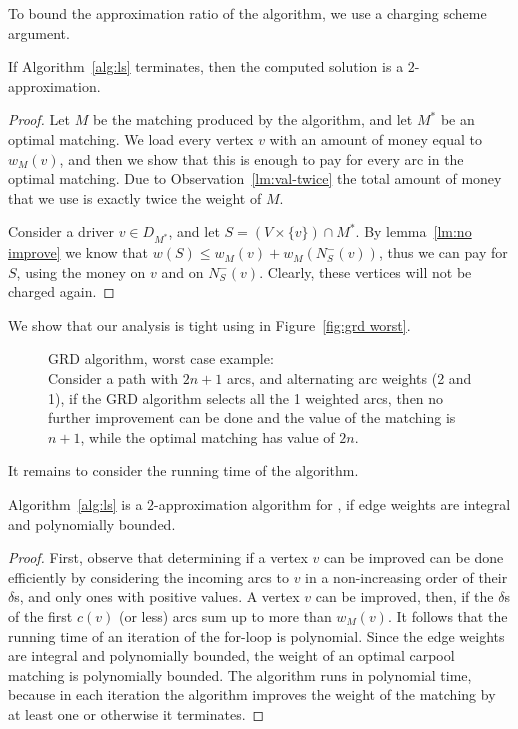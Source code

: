 To bound the approximation ratio of the algorithm, we use a charging
scheme argument.

\begin{lemma}
If Algorithm~\ref{alg:ls} terminates, then the computed solution is a
$2$-approximation.
\end{lemma}
\begin{proof}
Let $M$ be the matching produced by the algorithm, and let $M^*$ be an
optimal matching.  We load every vertex $v$ with an amount of money
equal to $w_M(v)$, and then we show that this is enough to pay for
every arc in the optimal matching.  Due to
Observation~\ref{lm:val-twice} the total amount of money that we use
is exactly twice the weight of $M$.

Consider a driver $v \in D_{M^*}$, and let $S = (V \times \{v\}) \cap
M^*$.  By lemma~\ref{lm:no improve} we know that $w(S) \leq w_M(v) +
w_M(N^-_S(v))$, thus we can pay for $S$, using the money on $v$ and on
$N^-_S(v)$.  Clearly, these vertices will not be charged again.
\end{proof}

We show that our analysis is tight using in Figure~\ref{fig:grd
worst}.


\begin{figure}
\centering

\caption[]{
\label{fig:grd worst}
GRD algorithm, worst case example: \\
Consider a path with $2n + 1$ arcs,
and alternating arc weights (2 and 1),
if the GRD algorithm selects all the 1 weighted arcs,
then no further improvement can be done and the value of the matching is $n + 1$,
while the optimal matching has value of $2n$.
}
\end{figure}

It remains to consider the running time of the algorithm.

\begin{theorem}
\label{thm:ls}
Algorithm~\ref{alg:ls} is a $2$-approximation algorithm for \carpool,
if edge weights are integral and polynomially bounded.
\end{theorem}
\begin{proof}
First, observe that determining if a vertex $v$ can be improved can be
done efficiently by considering the incoming arcs to $v$ in a
non-increasing order of their $\delta$s, and only ones with positive
values.  A vertex $v$ can be improved, then, if the $\delta$s of the
first $c(v)$ (or less) arcs sum up to more than $w_M(v)$.
%
It follows that the running time of an iteration of the for-loop is
polynomial.  Since the edge weights are integral and polynomially
bounded, the weight of an optimal carpool matching is polynomially
bounded.  The algorithm runs in polynomial time, because in each
iteration the algorithm improves the weight of the matching by at
least one or otherwise it terminates.
\end{proof}

